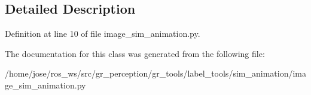 \subsection{Detailed Description}


Definition at line 10 of file image\+\_\+sim\+\_\+animation.\+py.



The documentation for this class was generated from the following file\+:\begin{DoxyCompactItemize}
\item 
/home/jose/ros\+\_\+ws/src/gr\+\_\+perception/gr\+\_\+tools/label\+\_\+tools/sim\+\_\+animation/image\+\_\+sim\+\_\+animation.\+py\end{DoxyCompactItemize}

